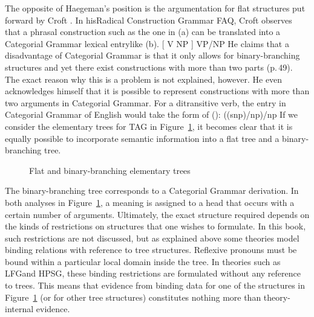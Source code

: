 The opposite of Haegeman's position is the argumentation for flat structures put forward by Croft
\citeyearpar[Section~1.6.2]{Croft2001a}. In his\indexcxg Radical Construction Grammar FAQ, Croft observes that
a phrasal construction such as the one in (a) can be translated into a Categorial Grammar
lexical entry\indexcg like (b).
\eal
\ex {}[ V NP ]
\ex VP/NP
\zl
He claims that a disadvantage of Categorial Grammar is that it only allows for binary-branching structures and yet there exist constructions
with more than two parts (p.\,49). The exact reason why this is a problem is not explained, however. He even acknowledges himself that
it is possible to represent constructions with more than two arguments in Categorial Grammar. For a ditransitive verb, the entry in Categorial
Grammar of English would take the form of ():
\ea
((s\bs np)/np)/np
\z
If we consider the elementary trees for TAG in Figure~\ref{Abbildung-TAG-flach-binaer}, it becomes clear that it is equally possible
to incorporate semantic information into a flat tree and a binary-branching tree.
\begin{figure}
\hfill
{}
\hfill
{}
\hfill\mbox{}
\caption{\label{Abbildung-TAG-flach-binaer}Flat and binary-branching elementary trees}
\end{figure}%
The binary-branching tree corresponds to a Categorial Grammar derivation. In both analyses in 
Figure~\ref{Abbildung-TAG-flach-binaer}, a meaning is assigned to a head that occurs with a certain
number of arguments. Ultimately, the exact structure required depends on the kinds of restrictions on structures
that one wishes to formulate.
In this book, such restrictions are not discussed, but as explained above some theories model binding relations
with reference to tree structures. Reflexive pronouns must be bound within a particular local domain inside the
tree. In theories such as LFG\indexlfg and HPSG\indexhpsg, these binding restrictions are formulated
without any reference to trees.
This means that evidence from binding data for one of the structures in Figure~\ref{Abbildung-TAG-flach-binaer} (or for
other tree structures) constitutes nothing more than theory-internal evidence.

